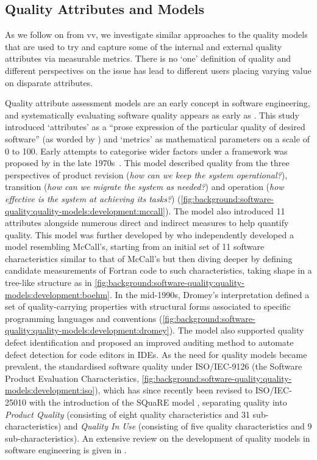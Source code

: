 \subsection{Quality Attributes and Models}

As we follow on from \gls{vv}, we investigate similar approaches to the quality models that are used to try and capture some of the internal and external quality attributes via measurable metrics. There is no `one' definition of quality and different perspectives on the issue has lead to different users placing varying value on disparate attributes.

Quality attribute assessment models are an early concept in software engineering, and systematically evaluating software quality appears as early as \citeyear{Rubey:1968fg} \citep{Rubey:1968fg}. This study introduced `attributes' as a ``prose expression of the particular quality of desired software'' (as worded by \citet{Boehm:1978vv}) and `metrics' as mathematical parameters on a scale of 0 to 100. 
Early attempts to categorise wider factors under a framework was proposed by \citeauthor*{McCall:1977uy} in the late 1970s~\citep{McCall:1977wm,Cavano:1978gz}. This model described quality from the three perspectives of product revision (\textit{how can we keep the system operational?}), transition (\textit{how can we migrate the system as needed?}) and operation (\textit{how effective is the system at achieving its tasks?}) (\cref{fig:background:software-quality:quality-models:development:mccall}). The model also introduced 11 attributes alongside numerous direct and indirect measures to help quantify quality.
This model was further developed by \citet{Boehm:1978vv} who independently developed a model resembling McCall's, starting from an initial set of 11 software characteristics similar to that of McCall's but then diving deeper by defining candidate measurements of Fortran code to such characteristics, taking shape in a tree-like structure as in \cref{fig:background:software-quality:quality-models:development:boehm}. 
In the mid-1990s, Dromey's interpretation \citep{Dromey:1995wy} defined a set of quality-carrying properties with structural forms associated to specific programming languages and conventions (\cref{fig:background:software-quality:quality-models:development:dromey}). The model also supported quality defect identification and proposed an improved auditing method to automate defect detection for code editors in IDEs. 
As the need for quality models became prevalent, the \citeauthor{ISO9126:1999} standardised software quality under ISO/IEC-9126 \citep{ISO9126:1999} (the Software Product Evaluation Characteristics, \cref{fig:background:software-quality:quality-models:development:iso}), which has since recently been revised to ISO/IEC-25010 with the introduction of the \gls{SQuaRE} model \citep{ISO25010:2011}, separating quality into \textit{Product Quality} (consisting of eight quality characteristics and 31 sub-characteristics) and \textit{Quality In Use} (consisting of five quality characteristics and 9 sub-characteristics).
An extensive review on the development of quality models in software engineering is given in \citep{AlQutaish:2010vua}.

